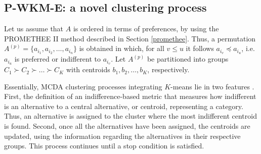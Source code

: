 \documentclass[]{elsarticle}
\theoremstyle{definition}
\begin{document}
%
%
%
%
%
%


\subsection{P-WKM-E: a novel clustering process}\label{rule}

Let us assume that $A$ is ordered in terms of preferences, by using the PROMETHEE II method described in Section \ref{promethee}. Thus, a permutation $A^{(p)}=\{a_{i_1},a_{i_2},\ldots,a_{i_n} \}$ is obtained in which, for all $v \leq u$ it follows $a_{i_v} \preceq a_{i_u}$, i.e. $a_{i_u}$ is preferred or indifferent to $a_{i_v}$. Let $A^{(p)}$ be partitioned into groups $C_1 \succ C_{2}\succ \ldots \succ C_K$ with centroids $b_1, b_{2}, \ldots, b_K$, respectively. 

Essentially, MCDA clustering processes integrating $K$-means lie in two features \citep{DeSmet2009,Lolli2014,Panapakidis2018, Chen2018}. First, the definition of  an indifference-based metric that measures how indifferent is an alternative to a central alternative, or centroid, representing a category. Thus, an alternative is assigned to the cluster where the most indifferent centroid is found. Second, once all the alternatives have been assigned, the centroids are updated, using the information regarding the alternatives in their respective groups.  This process continues until a stop condition is satisfied.  
\end{document}
